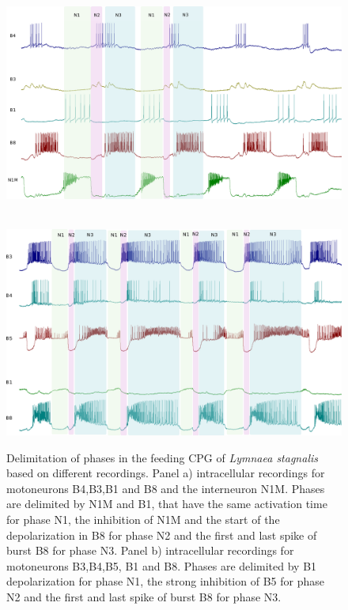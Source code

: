 \begin{figure}[bth!]
	\centering
	\begin{minipage}[b]{0.9\textwidth}
		\\
		\centering
		\includegraphics[width=\textwidth]{img/invariants/example_phases_1.pdf}
	\end{minipage}
	\vspace{20pt}
	\begin{minipage}[b]{0.9\textwidth}
		\\
		\centering
		\includegraphics[width=\textwidth]{img/invariants/example_phases_2.pdf}
	\end{minipage}
	\caption{Delimitation of phases in the feeding CPG of \textit{Lymnaea stagnalis} based on different recordings. Panel a) intracellular recordings for motoneurons B4,B3,B1 and B8 and the interneuron N1M. Phases are delimited by N1M and B1, that have the same activation time for phase N1, the inhibition of N1M and the start of the depolarization in B8 for phase N2 and the first and last spike of burst B8 for phase N3. Panel b) intracellular recordings for motoneurons B3,B4,B5, B1 and B8. Phases are delimited by B1 depolarization for phase N1, the strong inhibition of B5 for phase N2 and the first and last spike of burst B8 for phase N3.}
	\label{fig:example lymnaea phases recording}
\end{figure}

